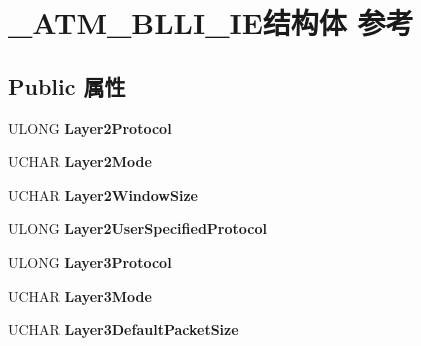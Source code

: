 \hypertarget{struct___a_t_m___b_l_l_i___i_e}{}\section{\+\_\+\+A\+T\+M\+\_\+\+B\+L\+L\+I\+\_\+\+I\+E结构体 参考}
\label{struct___a_t_m___b_l_l_i___i_e}
\subsection*{Public 属性}
\begin{DoxyCompactItemize}
\item 
\mbox{\label{struct___a_t_m___b_l_l_i___i_e_ae80f760ae281e1368a03675e450986de}} 
U\+L\+O\+NG {\bfseries Layer2\+Protocol}
\item 
\mbox{\label{struct___a_t_m___b_l_l_i___i_e_ad0af65e7a918f78d76ea96291a7908d7}} 
U\+C\+H\+AR {\bfseries Layer2\+Mode}
\item 
\mbox{\label{struct___a_t_m___b_l_l_i___i_e_a3ee6f44334f188ed0b1aa50fb5d49c94}} 
U\+C\+H\+AR {\bfseries Layer2\+Window\+Size}
\item 
\mbox{\label{struct___a_t_m___b_l_l_i___i_e_a23973627b7fb4c0076155b8ccd6d52c6}} 
U\+L\+O\+NG {\bfseries Layer2\+User\+Specified\+Protocol}
\item 
\mbox{\label{struct___a_t_m___b_l_l_i___i_e_aab50489ddc6b621ac5f87a0622695b88}} 
U\+L\+O\+NG {\bfseries Layer3\+Protocol}
\item 
\mbox{\label{struct___a_t_m___b_l_l_i___i_e_ad509a80dd819af0b3bf5355f1b0c354e}} 
U\+C\+H\+AR {\bfseries Layer3\+Mode}
\item 
\mbox{\label{struct___a_t_m___b_l_l_i___i_e_af365b400759b408ac70a8d69f8df1fe2}} 
U\+C\+H\+AR {\bfseries Layer3\+Default\+Packet\+Size}
\item 
\mbox{\label{struct___a_t_m___b_l_l_i___i_e_a14207bba6b7670208a5193576f59b9bd}} 

\end{DoxyCompactItemize}
